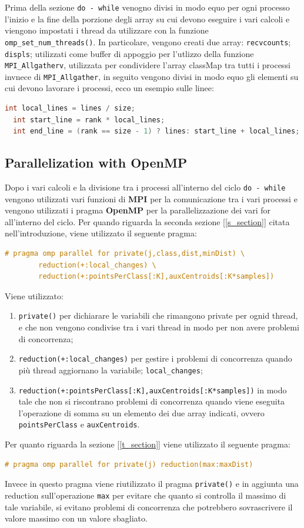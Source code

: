 \documentclass{article}
\begin{document}
  Prima della sezione \verb|do - while| venogno divisi in modo equo per ogni processo l'inizio e la fine della porzione degli array su cui devono eseguire i vari calcoli e viengono impostati i thread da utilizzare con la funzione 
  \verb|omp_set_num_threads()|. In particolare, vengono creati due array: \verb|recvcounts|; \verb|displs|; utilizzati come buffer di appoggio per l'utlizzo della funzione \verb|MPI_Allgatherv|, utilizzata per condividere l'array classMap tra tutti i processi invnece di 
  \verb|MPI_Allgather|, in seguito vengono divisi in modo equo gli elementi su cui devono lavorare i processi, ecco un esempio sulle linee:
  \begin{lstlisting}[language=C]
  int local_lines = lines / size;
  int start_line = rank * local_lines;
  int end_line = (rank == size - 1) ? lines: start_line + local_lines;
  \end{lstlisting}
  \subsection{Parallelization with OpenMP}
  Dopo i vari calcoli e la divisione tra i processi all'interno del ciclo \verb|do - while| vengono utilizzati vari funzioni di \textbf{MPI} per la comunicazione tra i vari processi e vengono utilizzati i pragma \textbf{OpenMP} per la parallelizzazione dei 
  vari for all'interno del ciclo. Per quando riguarda la seconda sezione [\ref{s_section}] citata nell'introduzione, viene utilizzato il seguente pragma:
  \begin{lstlisting}[language=C]
    # pragma omp parallel for private(j,class,dist,minDist) \
        reduction(+:local_changes) \
        reduction(+:pointsPerClass[:K],auxCentroids[:K*samples])
  \end{lstlisting}
  Viene utilizzato: 
  \begin{enumerate}
    \item \verb|private()| per dichiarare le variabili che rimangono private per ognid thread, e che non vengono condivise tra i vari thread in modo per non avere problemi di concorrenza; 
    \item \verb|reduction(+:local_changes)| per gestire i problemi di concorrenza quando più thread aggiornano la variabile; \verb|local_changes|; 
    \item \verb|reduction(+:pointsPerClass[:K],auxCentroids[:K*samples])| in modo tale che non si riscontrano problemi di concorrenza quando viene eseguita l'operazione di somma su un elemento dei due array indicati, ovvero \verb|pointsPerClass| e \verb|auxCentroids|.
  \end{enumerate}
  Per quanto riguarda la sezione [\ref{t_section}] viene utilizzato il seguente pragma:
  \begin{lstlisting}[language=C]
    # pragma omp parallel for private(j) reduction(max:maxDist)
  \end{lstlisting}
  Invece in questo pragma viene riutilizzato il pragma \verb|private()| e in aggiunta una reduction sull'operazione \verb|max| per evitare che quanto si controlla il massimo di tale variabile, si evitano problemi di concorrenza che potrebbero 
  sovrascrivere il valore massimo con un valore sbagliato.
\end{document}
